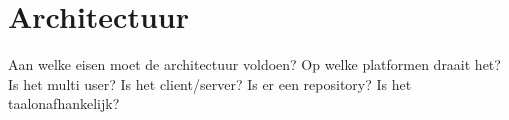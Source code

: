 
\section{Architectuur}
Aan welke eisen moet de architectuur voldoen?
Op welke platformen draait het?
Is het multi user? Is het client/server? Is er een repository?
Is het taalonafhankelijk?
